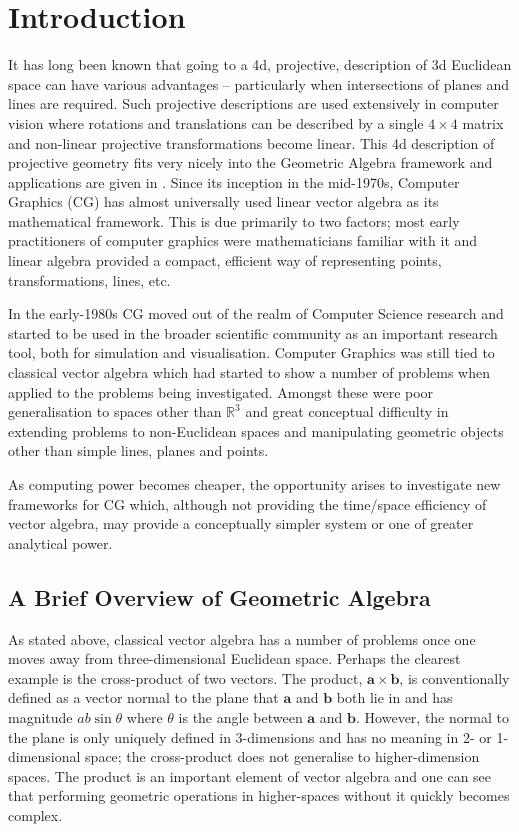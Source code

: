 \chapter{Introduction}

It has long been known that going to a 4d, projective, description
of 3d Euclidean space can have various advantages -- particularly
when intersections of planes and lines are required. Such
projective descriptions are used extensively in computer vision
where rotations and translations can be described by a single
$4\times 4$ matrix and non-linear projective transformations
become linear. This 4d description of projective geometry fits
very nicely into the Geometric Algebra framework and applications
are given in \cite{HZ91,IJPR00}. 
Since its inception in the mid-1970s, Computer Graphics (CG) has almost
universally used linear vector algebra as its mathematical framework.
This is due primarily to two factors; most early practitioners of
computer graphics were mathematicians familiar with it and 
linear algebra provided a compact, efficient way of representing points, 
transformations, lines, etc.

In the early-1980s CG moved out of the realm of Computer
Science research and started to be used in the broader scientific 
community as an important research tool, both for simulation and visualisation.
Computer Graphics was still tied to classical vector algebra which
had started to show a number of problems when applied to the problems
being investigated. Amongst these were poor generalisation to
spaces other than $\mathbb{R}^3$ and great conceptual difficulty 
in extending problems to non-Euclidean spaces and
manipulating geometric objects other than simple lines, planes and points.

As computing power becomes cheaper, the opportunity
arises to investigate new
frameworks for CG which, although not providing the time/space
efficiency of vector algebra, may provide a conceptually simpler
system or one of greater analytical power.

\section{A Brief Overview of Geometric Algebra}

As stated above, classical vector algebra has a number of problems
once one moves away from three-dimensional Euclidean space. Perhaps the
clearest example is the cross-product of two vectors.  The product, $\mathbf{a}
\times \mathbf{b}$, is conventionally defined as a vector normal to the plane
that $\mathbf{a}$ and $\mathbf{b}$ both lie in and has magnitude $ab\sin\theta$
where $\theta$ is the angle between $\mathbf{a}$ and $\mathbf{b}$. However, the
normal to the plane is only uniquely defined in 3-dimensions and has no meaning
in 2- or 1-dimensional space; the cross-product does not generalise to
higher-dimension spaces. The product is an important element of vector
algebra and one can see that performing geometric operations in higher-spaces
without it quickly becomes complex.


